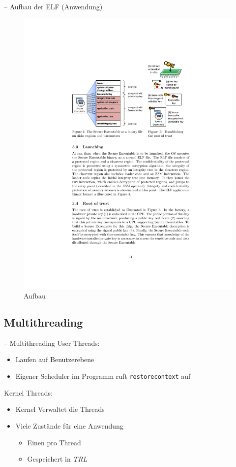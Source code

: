 \documentclass[fleqn,11pt,aspectratio=43,table]{beamer}
\newlength\foo
\begin{document}
\begin{frame}{\insertsectionhead -- Aufbau der ELF (Anwendung)}
	\begin{figure}
		\centering
		\includegraphics[width=.85\columnwidth]{aufbau}
		\caption*{\footnotesize Aufbau\cite{boivie2013secureblue++:big}}
	\end{figure}
\end{frame}

\subsection{Multithreading}

\begin{frame}{\insertsectionhead -- Multithreading}
	User Threads: \vfill
	\begin{itemize}
		\item Laufen auf Benutzerebene \vfill
		\item Eigener Scheduler im Programm ruft \texttt{restorecontext} auf \vfill
	\end{itemize} \vspace{1em}
	Kernel Threads: \vfill
	\begin{itemize}
		\item Kernel Verwaltet die Threads \vfill
		\item Viele Zustände für eine Anwendung \vfill
		\begin{itemize}
			\item Einen pro Thread \vfill
			\item Gespeichert in \emph{TRL} \vfill
		\end{itemize}
	\end{itemize}
\end{frame}
\end{document}
